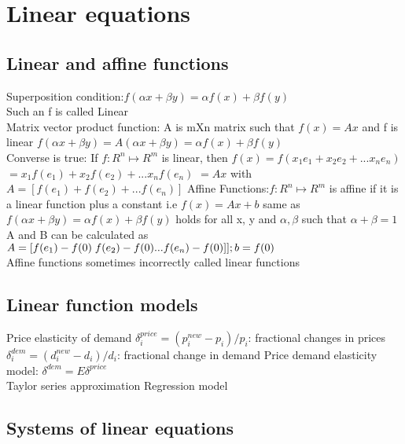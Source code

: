 \section{Linear equations}
\subsection{Linear and affine functions}
Superposition condition:$f(\alpha x + \beta y) = \alpha f(x) + \beta f(y)$\\
Such an f is called Linear\\
Matrix vector product function: A is mXn matrix such that $f(x)=Ax$ and f is linear $f(\alpha x + \beta y)=A(\alpha x + \beta y)=\alpha f(x) + \beta f(y)$\\
Converse is true: If $f:R^{n} \mapsto R^{m}$ is linear, then $f(x)=f(x_{1}e_{1}+x_{2}e_{2}+...x_{n}e_{n})$
\newline $=x_{1}f(e_{1})+x_{2}f(e_{2})+...x_{n}f(e_{n})$
\newline$=Ax$ with $A = [f(e_{1})+f(e_{2})+...f(e_{n})]$
\newline Affine Functions:$f:R^{n} \mapsto R^{m}$ is affine if it is a linear function plus a constant i.e $f(x)=Ax+b$ same as $f(\alpha x + \beta y)=\alpha f(x)+\beta f(y)$ holds for all x, y and $\alpha,\beta$ such that $\alpha+\beta=1$ 
\newline A and B can be calculated as \\
$A=[f(e_{1})-f(0)\thickspace f(e_{2})-f(0) ... f(e_{n})-f(0)]] ; b= f(0)$\\
Affine functions sometimes incorrectly called linear functions
\subsection{Linear function models}
Price elasticity of demand
$\delta_i^{price}=(p_i^{new}-p_{i})/p_{i}$: fractional changes in prices
$\delta_i^{dem}=(d_i^{new}-d_{i})/d_{i}$: fractional change in demand
Price demand elasticity model: $\delta^{dem}=E\delta^{price}$\\
Taylor series approximation
Regression model
\subsection{Systems of linear equations}